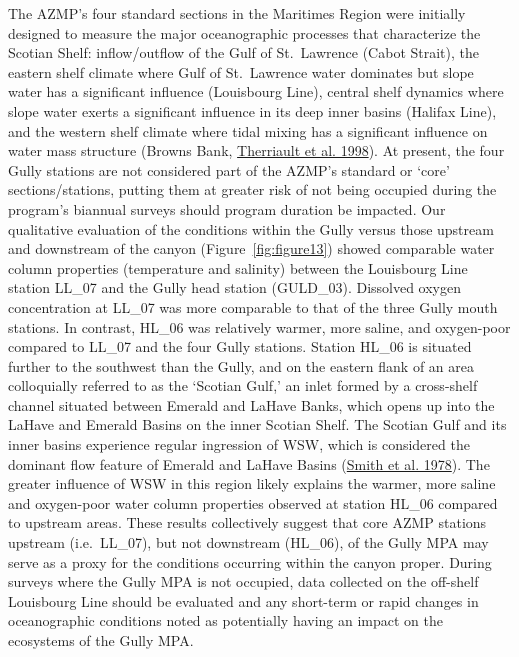 \documentclass[12pt]{article}\usepackage[]{graphicx}\usepackage[]{color}
\begin{document}
The AZMP's four standard sections in the Maritimes Region were initially designed to measure the major oceanographic processes that characterize the Scotian Shelf: inflow/outflow of the Gulf of St.~Lawrence (Cabot Strait), the eastern shelf climate where Gulf of St.~Lawrence water dominates but slope water has a significant influence (Louisbourg Line), central shelf dynamics where slope water exerts a significant influence in its deep inner basins (Halifax Line), and the western shelf climate where tidal mixing has a significant influence on water mass structure (Browns Bank, \protect\hyperlink{ref-therriault_1998}{Therriault et al. 1998}). At present, the four Gully stations are not considered part of the AZMP's standard or `core' sections/stations, putting them at greater risk of not being occupied during the program's biannual surveys should program duration be impacted. Our qualitative evaluation of the conditions within the Gully versus those upstream and downstream of the canyon (Figure~\ref{fig:figure13}) showed comparable water column properties (temperature and salinity) between the Louisbourg Line station LL\_07 and the Gully head station (GULD\_03). Dissolved oxygen concentration at LL\_07 was more comparable to that of the three Gully mouth stations. In contrast, HL\_06 was relatively warmer, more saline, and oxygen-poor compared to LL\_07 and the four Gully stations. Station HL\_06 is situated further to the southwest than the Gully, and on the eastern flank of an area colloquially referred to as the `Scotian Gulf,' an inlet formed by a cross-shelf channel situated between Emerald and LaHave Banks, which opens up into the LaHave and Emerald Basins on the inner Scotian Shelf. The Scotian Gulf and its inner basins experience regular ingression of WSW, which is considered the dominant flow feature of Emerald and LaHave Basins (\protect\hyperlink{ref-smith_1978}{Smith et al. 1978}). The greater influence of WSW in this region likely explains the warmer, more saline and oxygen-poor water column properties observed at station HL\_06 compared to upstream areas. These results collectively suggest that core AZMP stations upstream (i.e.~LL\_07), but not downstream (HL\_06), of the Gully MPA may serve as a proxy for the conditions occurring within the canyon proper. During surveys where the Gully MPA is not occupied, data collected on the off-shelf Louisbourg Line should be evaluated and any short-term or rapid changes in oceanographic conditions noted as potentially having an impact on the ecosystems of the Gully MPA.
\end{document}
